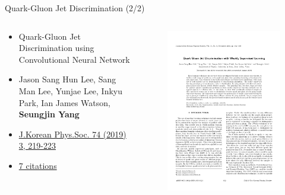 \begin{frame}[fragile]{Quark-Gluon Jet Discrimination (2/2)}
  \begin{columns}
    \begin{column}{0.6\textwidth}
      \begin{itemize}
        \item Quark-Gluon Jet Discrimination using Convolutional Neural Network
        \item Jason Sang Hun Lee, Sang Man Lee, Yunjae Lee, Inkyu Park, Ian James Watson, {\bf Seungjin Yang}
        \item \href{https://doi.org/10.3938/jkps.75.652}{J.Korean Phys.Soc. 74 (2019) 3, 219-223}
        \item \href{https://inspirehep.net/literature/1765363}{7 citations}
      \end{itemize}
    \end{column}

    \begin{column}{0.4\textwidth}
      \begin{figure}[htpb]
        \centering
        \includegraphics[width=1.0\textwidth]{fig/publication/JP19-0292_F.pdf}
      \end{figure}
    \end{column}
  \end{columns}
\end{frame}
